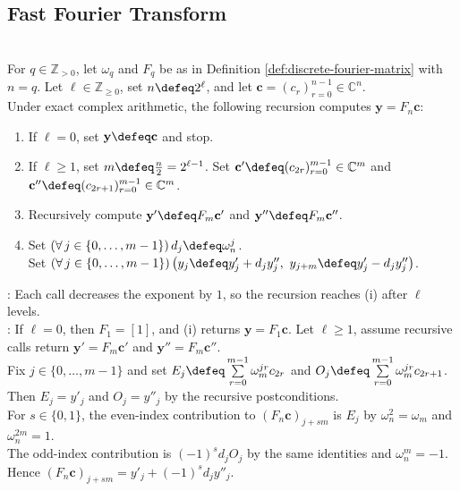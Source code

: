 \subsection{Fast Fourier Transform}

\begin{computationmethod} \label{meth:radix-two-fft-split} \\
For $q\in\mathbb{Z}_{>0}$, let $\omega_q$ and $F_q$ be as in Definition \ref{def:discrete-fourier-matrix} with $n=q$. Let $\ell\in\mathbb{Z}_{\geq0}$, set $n\defeq2^\ell$, and let $\mathbf{c}=(c_r)_{r=0}^{n-1}\in\mathbb{C}^n$.\\
Under exact complex arithmetic, the following recursion computes $\mathbf{y}=F_n\mathbf{c}$:
\begin{enumerate}[label=(\roman*)]
\setlength{\itemsep}{0pt}
\item If $\ell=0$, set $\mathbf{y}\defeq\mathbf{c}$ and stop.
\item If $\ell\geq1$, set $m\defeq\frac{n}{2}=2^{\ell-1}$. Set $\mathbf{c}'\defeq(c_{2r})_{r=0}^{m-1}\in\mathbb{C}^m$ and $\mathbf{c}''\defeq(c_{2r+1})_{r=0}^{m-1}\in\mathbb{C}^m$.
\item Recursively compute $\mathbf{y}'\defeq F_m\mathbf{c}'$ and $\mathbf{y}''\defeq F_m\mathbf{c}''$.
\item Set $(\forall\,j\in\{0,\ldots,m-1\})\,d_j\defeq\omega_n^j$.\\
Set $(\forall\,j\in\{0,\ldots,m-1\})\,\bigl(y_j\defeq y'_j+d_jy''_j,\ y_{j+m}\defeq y'_j-d_jy''_j\bigr)$.
\end{enumerate}
: Each call decreases the exponent by $1$, so the recursion reaches (i) after $\ell$ levels.\\
: If $\ell=0$, then $F_1=[1]$, and (i) returns $\mathbf{y}=F_1\mathbf{c}$. Let $\ell\geq1$, assume recursive calls return $\mathbf{y}'=F_m\mathbf{c}'$ and $\mathbf{y}''=F_m\mathbf{c}''$.\\
Fix $j\in\{0,\ldots,m-1\}$ and set $E_j\defeq\sum\limits_{r=0}^{m-1}\omega_m^{jr}c_{2r}$ and $O_j\defeq\sum\limits_{r=0}^{m-1}\omega_m^{jr}c_{2r+1}$. Then $E_j=y'_j$ and $O_j=y''_j$ by the recursive postconditions.\\
For $s\in\{0,1\}$, the even-index contribution to $(F_n\mathbf{c})_{j+sm}$ is $E_j$ by $\omega_n^2=\omega_m$ and $\omega_n^{2m}=1$.\\
The odd-index contribution is $(-1)^sd_jO_j$ by the same identities and $\omega_n^m=-1$. Hence $(F_n\mathbf{c})_{j+sm}=y'_j+(-1)^sd_jy''_j$.\\

\end{computationmethod}
